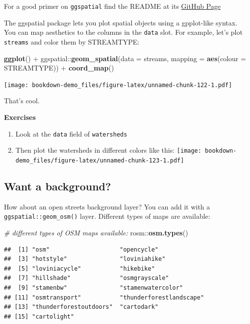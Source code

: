 \documentclass[]{book}
\newenvironment{Shaded}{\begin{snugshade}}{\end{snugshade}}
\newcommand{\KeywordTok}[1]{\textcolor[rgb]{0.13,0.29,0.53}{\textbf{{#1}}}}
\newcommand{\DataTypeTok}[1]{\textcolor[rgb]{0.13,0.29,0.53}{{#1}}}
\newcommand{\StringTok}[1]{\textcolor[rgb]{0.31,0.60,0.02}{{#1}}}
\newcommand{\CommentTok}[1]{\textcolor[rgb]{0.56,0.35,0.01}{\textit{{#1}}}}
\newcommand{\NormalTok}[1]{{#1}}
\providecommand{\tightlist}{%
  \setlength{\itemsep}{0pt}\setlength{\parskip}{0pt}}
\theoremstyle{definition}
\theoremstyle{definition}
\theoremstyle{remark}
\begin{document}
For a good primer on \texttt{ggspatial} find the README at its
\href{https://github.com/paleolimbot/ggspatial}{GitHub Page}

The ggspatial package lets you plot spatial objects using a gpplot-like
syntax. You can map aesthetics to the columns in the \texttt{data} slot.
For example, let's plot \texttt{streams} and color them by STREAMTYPE:

\begin{Shaded}
\begin{Highlighting}[]
\KeywordTok{ggplot}\NormalTok{() +}
\StringTok{  }\NormalTok{ggspatial::}\KeywordTok{geom_spatial}\NormalTok{(}\DataTypeTok{data =} \NormalTok{streams, }\DataTypeTok{mapping =} \KeywordTok{aes}\NormalTok{(}\DataTypeTok{colour =} \NormalTok{STREAMTYPE)) +}
\StringTok{  }\KeywordTok{coord_map}\NormalTok{()}
\end{Highlighting}
\end{Shaded}

\texttt{[image: bookdown-demo\_files/figure-latex/unnamed-chunk-122-1.pdf]}

That's cool.

\textbf{Exercises}

\begin{enumerate}
\def\labelenumi{\arabic{enumi}.}
\tightlist
\item
  Look at the \texttt{data} field of \texttt{watersheds}
\item
  Then plot the watersheds in different colors like this:
  \texttt{[image: bookdown-demo\_files/figure-latex/unnamed-chunk-123-1.pdf]}
\end{enumerate}

\subsection{Want a background?}\label{want-a-background}

How about an open streets background layer? You can add it with a
\texttt{ggspatial::geom\_osm()} layer. Different types of maps are
available:

\begin{Shaded}
\begin{Highlighting}[]
\CommentTok{# different types of OSM maps available:}
\NormalTok{rosm::}\KeywordTok{osm.types}\NormalTok{()}
\end{Highlighting}
\end{Shaded}

\begin{verbatim}
##  [1] "osm"                    "opencycle"             
##  [3] "hotstyle"               "loviniahike"           
##  [5] "loviniacycle"           "hikebike"              
##  [7] "hillshade"              "osmgrayscale"          
##  [9] "stamenbw"               "stamenwatercolor"      
## [11] "osmtransport"           "thunderforestlandscape"
## [13] "thunderforestoutdoors"  "cartodark"             
## [15] "cartolight"
\end{verbatim}
\end{document}
